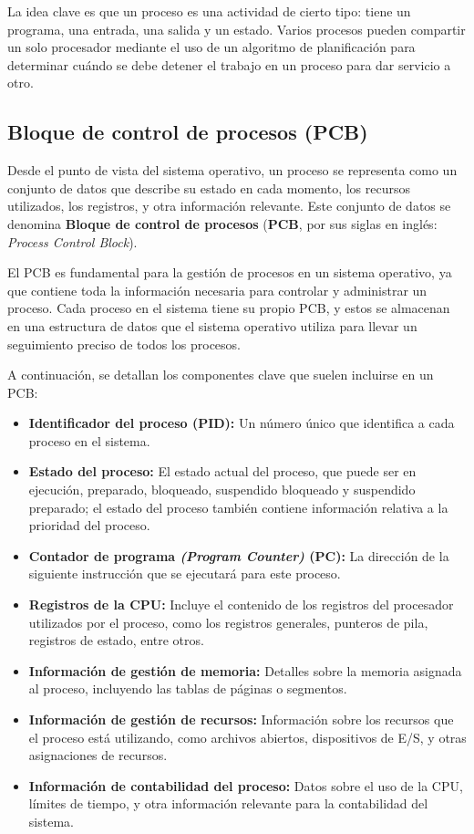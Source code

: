 La idea clave es que un proceso es una actividad de cierto tipo: tiene un programa, una entrada, una salida y un estado. Varios procesos pueden compartir un solo procesador mediante el uso de un algoritmo de planificación para determinar cuándo se debe detener el trabajo en un proceso para dar servicio a otro.


\subsection{Bloque de control de procesos (PCB)}

Desde el punto de vista del sistema operativo, un proceso se representa como un conjunto de datos que describe su estado en cada momento, los recursos utilizados, los registros, y otra información relevante. Este conjunto de datos se denomina \textbf{Bloque de control de procesos} (\textbf{PCB}, por sus siglas en inglés: \textit{Process Control Block}).

El PCB es fundamental para la gestión de procesos en un sistema operativo, ya que contiene toda la información necesaria para controlar y administrar un proceso. Cada proceso en el sistema tiene su propio PCB, y estos se almacenan en una estructura de datos que el sistema operativo utiliza para llevar un seguimiento preciso de todos los procesos.

A continuación, se detallan los componentes clave que suelen incluirse en un PCB:

\begin{tcolorbox}
	\begin{itemize}
		\item \textbf{Identificador del proceso (PID):} Un número único que identifica a cada proceso en el sistema.
		\item \textbf{Estado del proceso:} El estado actual del proceso, que puede ser en ejecución, preparado, bloqueado, suspendido bloqueado y suspendido preparado; el estado del proceso también contiene información relativa a la prioridad del proceso.
		\item \textbf{Contador de programa \textit{(Program Counter)} (PC):} La dirección de la siguiente instrucción que se ejecutará para este proceso.
		\item \textbf{Registros de la CPU:} Incluye el contenido de los registros del procesador utilizados por el proceso, como los registros generales, punteros de pila, registros de estado, entre otros.
		\item \textbf{Información de gestión de memoria:} Detalles sobre la memoria asignada al proceso, incluyendo las tablas de páginas o segmentos.
		\item \textbf{Información de gestión de recursos:} Información sobre los recursos que el proceso está utilizando, como archivos abiertos, dispositivos de E/S, y otras asignaciones de recursos.
		\item \textbf{Información de contabilidad del proceso:} Datos sobre el uso de la CPU, límites de tiempo, y otra información relevante para la contabilidad del sistema.
	\end{itemize}
\end{tcolorbox}

